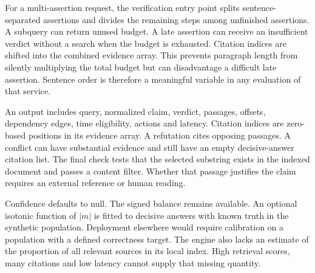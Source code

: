 For a multi-assertion request, the verification entry point splits sentence-separated assertions and divides the remaining steps among unfinished assertions. A subquery can return unused budget. A late assertion can receive an insufficient verdict without a search when the budget is exhausted. Citation indices are shifted into the combined evidence array. This prevents paragraph length from silently multiplying the total budget but can disadvantage a difficult late assertion. Sentence order is therefore a meaningful variable in any evaluation of that service.

An output includes query, normalized claim, verdict, passages, offsets, dependency edges, time eligibility, actions and latency. Citation indices are zero-based positions in its evidence array. A refutation cites opposing passages. A conflict can have substantial evidence and still have an empty decisive-answer citation list. The final check tests that the selected substring exists in the indexed document and passes a content filter. Whether that passage justifies the claim requires an external reference or human reading.

Confidence defaults to null. The signed balance remains available. An optional isotonic function of $|m|$ is fitted to decisive answers with known truth in the synthetic population. Deployment elsewhere would require calibration on a population with a defined correctness target. The engine also lacks an estimate of the proportion of all relevant sources in its local index. High retrieval scores, many citations and low latency cannot supply that missing quantity.
